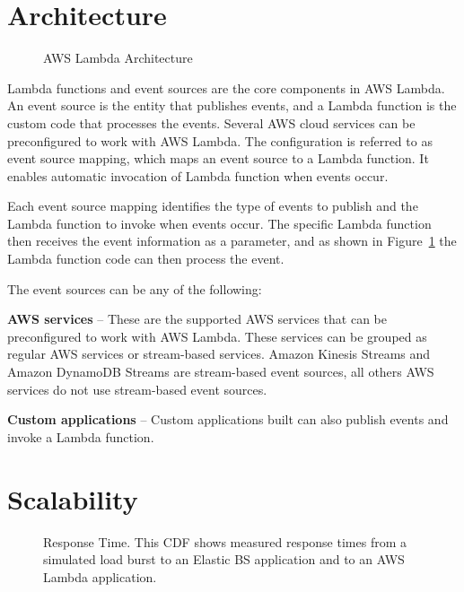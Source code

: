 \documentclass[9pt,twocolumn,twoside]{../../styles/osajnl}
\begin{document}
\section{Architecture}

\begin{figure}[h]
\centering
\graphicspath{ {images/} }
\caption{AWS Lambda Architecture} \cite{www-AWSLambda}
\label{fig:arch}
\end{figure}

Lambda functions and event sources are the core components in AWS Lambda. An 
event source is the entity that publishes events, and a Lambda function is the 
custom code that processes the events. Several AWS cloud services can be 
preconfigured to work with AWS Lambda. The configuration is referred to as 
event source mapping, which maps an event source to a Lambda function. It 
enables automatic invocation of Lambda function when events occur.

Each event source mapping identifies the type of events to publish and the 
Lambda function to invoke when events occur. The specific Lambda function then 
receives the event information as a parameter, and as shown in Figure~\ref{fig:arch} the 
Lambda function code can then process the event.

The event sources can be any of the following:

\textbf{AWS services} – These are the supported AWS services that can be 
preconfigured to work with AWS Lambda. These services can be grouped as regular 
AWS services or stream-based services. Amazon Kinesis Streams 
\cite{www-AWSKinesis} and Amazon DynamoDB Streams \cite{www-AWSDynamoStream} 
are stream-based event sources, all others AWS services do not use stream-based 
event sources. 
 
\textbf{Custom applications} – Custom applications built can also publish 
events and invoke a Lambda function.

\section{Scalability}

\begin{figure}[H]
\centering
\graphicspath{ {images/} }
\caption{Response Time. This CDF shows measured
response times from a simulated load burst to an Elastic BS
application and to an AWS Lambda application.}  \cite{OpenLambda}
\label{fig:scale}
\end{figure}
\end{document}
